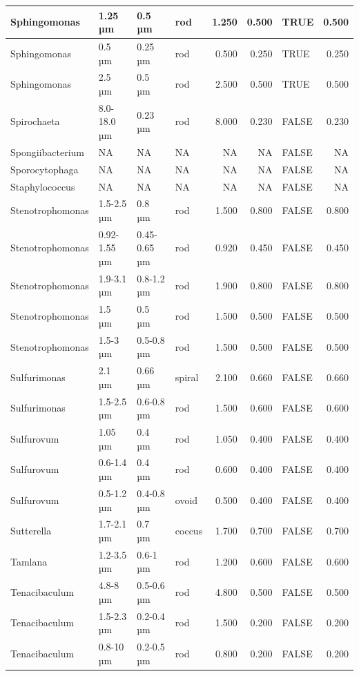 \documentclass[
]{article}
\begin{document}
\begin{table}
\begin{tabular}{l|l|l|l|r|r|l|r}
\hline
Sphingomonas & 1.25 µm & 0.5 µm & rod & 1.250 & 0.500 & TRUE & 0.500\\
\hline
Sphingomonas & 0.5 µm & 0.25 µm & rod & 0.500 & 0.250 & TRUE & 0.250\\
\hline
Sphingomonas & 2.5 µm & 0.5 µm & rod & 2.500 & 0.500 & TRUE & 0.500\\
\hline
Spirochaeta & 8.0-18.0 µm & 0.23 µm & rod & 8.000 & 0.230 & FALSE & 0.230\\
\hline
Spongiibacterium & NA & NA & NA & NA & NA & FALSE & NA\\
\hline
Sporocytophaga & NA & NA & NA & NA & NA & FALSE & NA\\
\hline
Staphylococcus & NA & NA & NA & NA & NA & FALSE & NA\\
\hline
Stenotrophomonas & 1.5-2.5 µm & 0.8 µm & rod & 1.500 & 0.800 & FALSE & 0.800\\
\hline
Stenotrophomonas & 0.92-1.55 µm & 0.45-0.65 µm & rod & 0.920 & 0.450 & FALSE & 0.450\\
\hline
Stenotrophomonas & 1.9-3.1 µm & 0.8-1.2 µm & rod & 1.900 & 0.800 & FALSE & 0.800\\
\hline
Stenotrophomonas & 1.5 µm & 0.5 µm & rod & 1.500 & 0.500 & FALSE & 0.500\\
\hline
Stenotrophomonas & 1.5-3 µm & 0.5-0.8 µm & rod & 1.500 & 0.500 & FALSE & 0.500\\
\hline
Sulfurimonas & 2.1 µm & 0.66 µm & spiral & 2.100 & 0.660 & FALSE & 0.660\\
\hline
Sulfurimonas & 1.5-2.5 µm & 0.6-0.8 µm & rod & 1.500 & 0.600 & FALSE & 0.600\\
\hline
Sulfurovum & 1.05 µm & 0.4 µm & rod & 1.050 & 0.400 & FALSE & 0.400\\
\hline
Sulfurovum & 0.6-1.4 µm & 0.4 µm & rod & 0.600 & 0.400 & FALSE & 0.400\\
\hline
Sulfurovum & 0.5-1.2 µm & 0.4-0.8 µm & ovoid & 0.500 & 0.400 & FALSE & 0.400\\
\hline
Sutterella & 1.7-2.1 µm & 0.7 µm & coccus & 1.700 & 0.700 & FALSE & 0.700\\
\hline
Tamlana & 1.2-3.5 µm & 0.6-1 µm & rod & 1.200 & 0.600 & FALSE & 0.600\\
\hline
Tenacibaculum & 4.8-8 µm & 0.5-0.6 µm & rod & 4.800 & 0.500 & FALSE & 0.500\\
\hline
Tenacibaculum & 1.5-2.3 µm & 0.2-0.4 µm & rod & 1.500 & 0.200 & FALSE & 0.200\\
\hline
Tenacibaculum & 0.8-10 µm & 0.2-0.5 µm & rod & 0.800 & 0.200 & FALSE & 0.200\\

\end{tabular}
\end{table}
\end{document}
